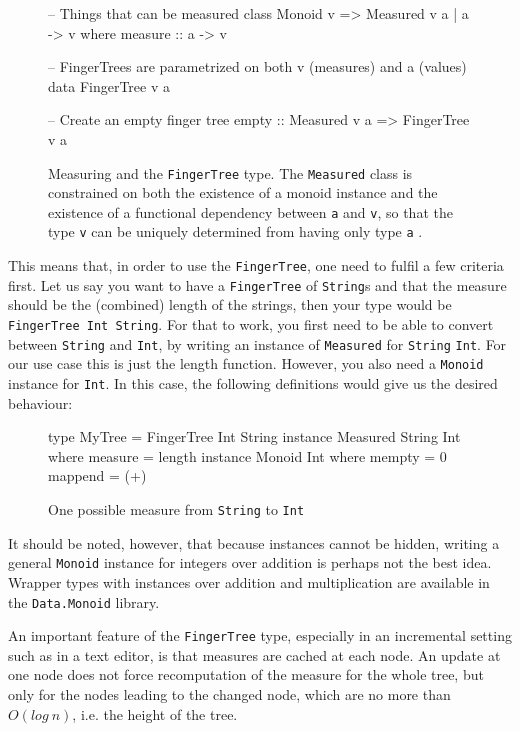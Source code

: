 \documentclass[a4paper,12pt,notitlepage]{report}
\renewcommand\cite{\citep}
\begin{document}
\begin{figure}[H]
\begin{code}
-- Things that can be measured
class Monoid v => Measured v a | a -> v where
    measure :: a -> v

-- FingerTrees are parametrized on both v (measures) and a (values)
data FingerTree v a

-- Create an empty finger tree
empty :: Measured v a => FingerTree v a
\end{code}
\caption{\small Measuring and the \texttt{FingerTree} type. The \texttt{Measured} class
is constrained on both the existence of a monoid instance and the existence of a
functional dependency between \texttt{a} and \texttt{v}, so that the type
\texttt{v} can be uniquely determined from having only type \texttt{a}
\cite{fundeps}.} 
\end{figure}

This means that, in order to use the \texttt{FingerTree}, one need to fulfil a
few criteria first. Let us say you want to have a \texttt{FingerTree} of
\texttt{String}s and that the measure should be the (combined) length of the
strings, then your type would be \texttt{FingerTree Int String}. For that to
work, you first need to be able to convert between \texttt{String} and
\texttt{Int}, by writing an instance of \texttt{Measured} for \texttt{String}
\texttt{Int}. For our use case this is just the length function. However, you
also need a \texttt{Monoid} instance for \texttt{Int}. In this case, the
following definitions would give us the desired behaviour:

\begin{figure}[H]
\begin{code}
type MyTree = FingerTree Int String
instance Measured String Int where
    measure = length
instance Monoid Int where
    mempty = 0
    mappend = (+)
\end{code}
\caption{\small One possible measure from \texttt{String} to \texttt{Int}}
\end{figure}
It should be noted, however, that because instances cannot be hidden, writing a
general \texttt{Monoid} instance for integers over addition is perhaps not the
best idea. Wrapper types with instances over addition and multiplication are
available in the \texttt{Data.Monoid} library. 

An important feature of the \texttt{FingerTree} type, especially in an incremental
setting such as in a text editor, is that measures are cached at each node. An
update at one node does not force recomputation of the measure for the whole
tree, but only for the nodes leading to the changed node, which are no more than
$O(log\ n)$, i.e. the height of the tree. 
\end{document}
